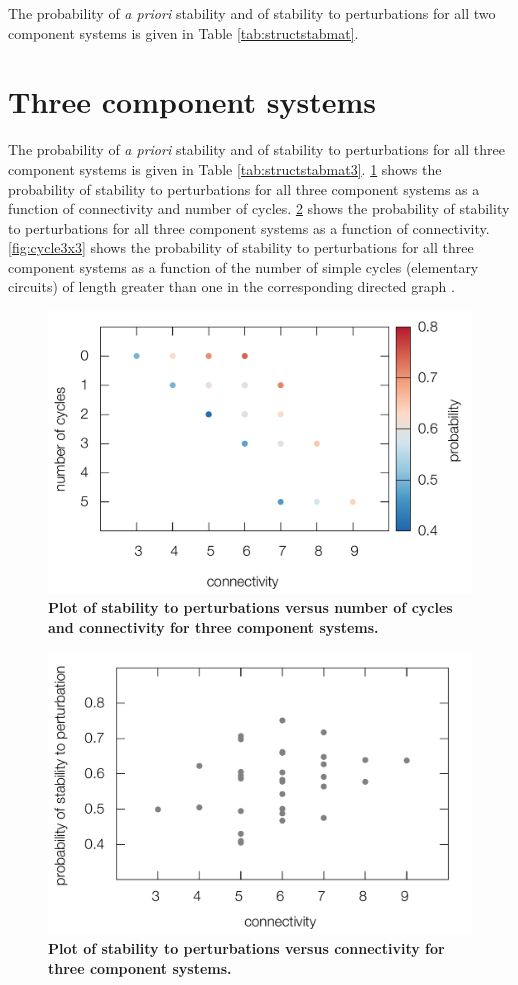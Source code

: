 \documentclass{amsart}
\theoremstyle{definition}
\theoremstyle{remark}
\numberwithin{equation}{section}
\begin{document}
The probability of \emph{a priori} stability and of stability to perturbations for all two component systems is given in Table \ref{tab:structstabmat}.

\section{Three component systems}

The probability of \emph{a priori} stability and of stability to perturbations for all three component systems is given in Table \ref{tab:structstabmat3}. \ref{fig:connectcycle3D3x3} shows the probability of stability to perturbations for all three component systems as a function of connectivity and number of cycles. \ref{fig:stab3x3} shows the probability of stability to perturbations for all three component systems as a function of connectivity. \ref{fig:cycle3x3} shows the probability of stability to perturbations for all three component systems as a function of the number of simple cycles (elementary circuits) of length greater than one in the corresponding directed graph \cite{Johnson1975}.

\begin{figure}[!ht]
\centering
\noindent\includegraphics[width=0.8\columnwidth]{fig/connectcycle3D3x3.pdf}
\caption{{\bf Plot of stability to perturbations versus number of cycles and connectivity for three component systems.} }
\label{fig:connectcycle3D3x3}
\end{figure}

\begin{figure}[!ht]
\centering
\noindent\includegraphics[width=0.8\columnwidth]{fig/stab3x3.pdf}
\caption{{\bf Plot of stability to perturbations versus connectivity for three component systems.} }
\label{fig:stab3x3}
\end{figure}
\end{document}
